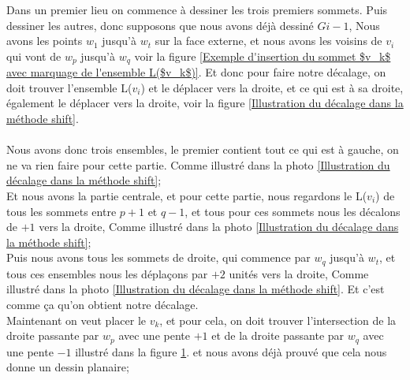 \documentclass[hidelinks,letterpaper,12pt]{article}
\newcounter{Exemple} %
\begin{document}
\begin{figure}[H]
\begin{tikzpicture}[scale=1]
	
\end{tikzpicture}
\label{Illustration de la position du sommet $v_k$ sur le graphe $G_{k−1}$, et l'ensemble L($v_i$) sous forme d'une structure arborescente}	
\end{figure}
Dans un premier lieu on commence à dessiner les trois premiers sommets. Puis dessiner les autres, donc supposons que nous avons déjà dessiné $G{i-1}$, Nous avons les points $w_1$ jusqu’à $w_t$ sur la face externe, et nous avons les voisins de $v_i$ qui vont de $w_p$ jusqu’à $w_q$ voir la figure \ref{Exemple d'insertion du sommet $v_k$ avec marquage de l'ensemble L($v_k$)}. Et donc pour faire notre décalage, on doit trouver l'ensemble L($v_i$) et le déplacer vers la droite, et ce qui est à sa droite, également le déplacer vers la droite, voir la figure \ref{Illustration du décalage dans la méthode shift}.
\\ \\
Nous avons donc trois ensembles, le premier contient tout ce qui est à gauche, on ne va rien faire pour cette partie. Comme illustré dans la photo \ref{Illustration du décalage dans la méthode shift};\\
Et nous avons la partie centrale, et pour cette partie, nous regardons le L($v_i$) de tous les sommets entre $p+1$ et $q-1$, et tous pour ces sommets nous les décalons de $+1$ vers la droite, Comme illustré dans la photo \ref{Illustration du décalage dans la méthode shift};\\
Puis nous avons tous les sommets de droite, qui commence par $w_q$ jusqu'à $w_t$, et tous ces ensembles nous les déplaçons par $+2$ unités vers la droite, Comme illustré dans la photo \ref{Illustration du décalage dans la méthode shift}.
Et c'est comme ça qu'on obtient notre décalage.
\\
Maintenant on veut placer le $v_k$, et pour cela, on doit trouver l’intersection de la droite passante par $w_p$ avec une pente $+1$ et de la droite passante par $w_q$ avec une pente $−1$ illustré dans la figure \ref{Illustration de la position du sommet $v_k$ sur le graphe $G_{k−1}$, et l'ensemble L($v_i$) sous forme d'une structure arborescente}. et nous avons déjà prouvé que cela nous donne un dessin planaire;
\end{document}
